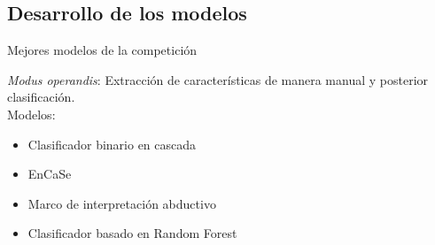 
\subsection{Desarrollo de los modelos}

\begin{frame}{Mejores modelos de la competición}

    {\vspace{-1.5cm} \textit{Modus operandis}: Extracción de características de manera manual y posterior clasificación.} \\
    \vspace{1 cm}
    Modelos:
    \pause 
    \begin{itemize}
        \item Clasificador binario en cascada
        \pause
        \item EnCaSe
        \pause
        \item Marco de interpretación abductivo
        \pause 
        \item Clasificador basado en Random Forest
    \end{itemize}
    
\end{frame} 


